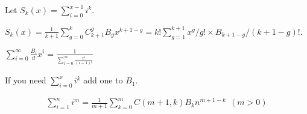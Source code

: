 Let $S_k(x)=\sum_{i=0}^{x-1}i^k$.\par
$S_k(x)=\frac{1}{k+1}\sum_{g=0}^k C_{k+1}^g B_g x^{k+1-g}=k!\sum_{g=1}^{k+1} x^g/g! \times B_{k+1-g}/(k+1-g)!$.\par
$\sum_{i=0}^{\infty} \frac{B_i}{i!}x^i=\frac{1}{\sum_{i=0}^{\infty}\frac{x^i}{(i+1)!}}$\par
If you need $\sum_{i=0}^x i^k$ add one to $B_1$.\par
\begin{eqnarray*}
\sum_{i=1}^n i^m=\frac{1}{m+1}\sum_{k=0}^mC(m+1,k)B_kn^{m+1-k}~~(m>0)
\end{eqnarray*}\par